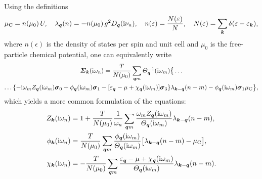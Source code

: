 Using the definitions \cite{MargineGiustino13}
%
\begin{align*}
    \mu \sb{\text{C}} = n(\mu_0) \, U,
        \quad
    \lambda_{\boldsymbol q}(n) = -n(\mu_0) \, g^2 D_{\boldsymbol q}(\mathrm i \nu_n),
        \quad
    n(\varepsilon) = \frac{N(\varepsilon)} N,
        \quad
    N(\varepsilon) = \sum_{\boldsymbol k} \delta(\varepsilon - \varepsilon_{\boldsymbol k}),
\end{align*}
%
where $n(\epsilon)$ is the density of states per spin and unit cell and $\mu_0$
is the free-particle chemical potential, one can equivalently write
%
\begin{multline*}
    \boldsymbol {\varSigma}_{\boldsymbol k} (\mathrm i \omega_n)
    = \frac T {N(\mu_0)} \sum_{\boldsymbol q m}
    \varTheta_{\boldsymbol q}^{-1}(\mathrm i \omega_m) \big \{ \dots
        \\
        \dots \{
            - \mathrm i \omega_m Z_{\boldsymbol q}(\mathrm i \omega_m) \boldsymbol \sigma_0
            + \phi_{\boldsymbol q}(\mathrm i \omega_m) \boldsymbol \sigma_1
            - [\varepsilon_{\boldsymbol q} - \mu + \chi_{\boldsymbol q}(\mathrm i \omega_m)]
            \boldsymbol \sigma_3
            \}
        \lambda_{\boldsymbol k - \boldsymbol q}(n - m)
        - \phi_{\boldsymbol q}(\mathrm i \omega_m) \boldsymbol \sigma_1 \mu \sb{\text{C}}
    \big \},
\end{multline*}
%
which yields a more common formulation of the  equations:
%
\begin{subequations} \label{Eliashberg equations}
    \begin{align}
        Z_{\boldsymbol k}(\mathrm i \omega_n) &= 1 + \frac T {N(\mu_0)} \frac 1 {\omega_n}
        \sum_{\boldsymbol q m} \frac
            {\omega_m Z_{\boldsymbol q}(\mathrm i \omega_m)}
            {\varTheta_{\boldsymbol q}(\mathrm i \omega_m)}
        \lambda_{\boldsymbol k - \boldsymbol q}(n - m),
        \\
        \phi_{\boldsymbol k}(\mathrm i \omega_n) &= \frac T {N(\mu_0)}
        \sum_{\boldsymbol q m} \frac
            {\phi_{\boldsymbol q}(\mathrm i \omega_m)}
            {\varTheta_{\boldsymbol q}(\mathrm i \omega_m)}
        \big[
            \lambda_{\boldsymbol k - \boldsymbol q}(n - m) - \mu \sb{\text{C}}
        \big],
        \\
        \chi_{\boldsymbol k}(\mathrm i \omega_n) &= -\frac T {N(\mu_0)}
        \sum_{\boldsymbol q m} \frac
            {\varepsilon_{\boldsymbol q} - \mu + \chi_{\boldsymbol q}(\mathrm i \omega_m)}
            {\varTheta_{\boldsymbol q}(\mathrm i \omega_m)}
        \lambda_{\boldsymbol k - \boldsymbol q}(n - m).
    \end{align}
\end{subequations}

